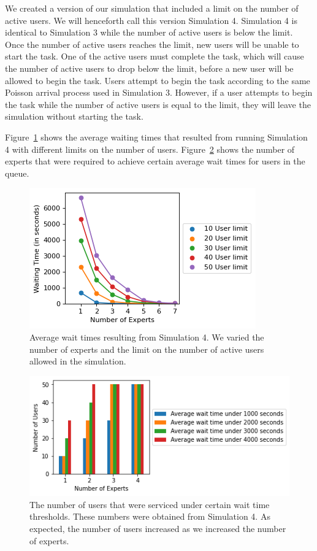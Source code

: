 We created a version of our simulation that included a limit on the number of
active users.
We will henceforth call this version Simulation 4.
Simulation 4 is identical to Simulation 3 while the number of active users is
below the limit.
Once the number of active users reaches the limit, new users will be unable to
start the task.
One of the active users must complete the task, which will cause the number of
active users to drop below the limit, before a new user will be allowed to begin
the task.
Users attempt to begin the task according to the same Poisson arrival process
used in Simulation 3.
However, if a user attempts to begin the task while the number of active users
is equal to the limit, they will leave the simulation without starting the task.

Figure~\ref{fig:vary_num_users} shows the average waiting times that resulted
from running Simulation 4 with different limits on the number of users.
Figure~\ref{fig:vary_num_users2} shows the number of experts that were required
to achieve certain average wait times for users in the queue.

\begin{figure}[h]
  \includegraphics{figures/montecarlo/vary_num_users.png}
  \caption[Average wait times resulting from Simulation 4]{
    Average wait times resulting from Simulation 4.
    We varied the number of experts and the limit on the number of active users
    allowed in the simulation.
  }\label{fig:vary_num_users}
\end{figure}

\begin{figure}[h]
  \includegraphics{figures/montecarlo/vary_num_users2.png}
  \caption[
  The number of users that were serviced under certain wait time thresholds
  ]{
    The number of users that were serviced under certain wait time thresholds.
    These numbers were obtained from Simulation 4.
    As expected, the number of users increased as we increased the number of
    experts.
  }\label{fig:vary_num_users2}
\end{figure}

